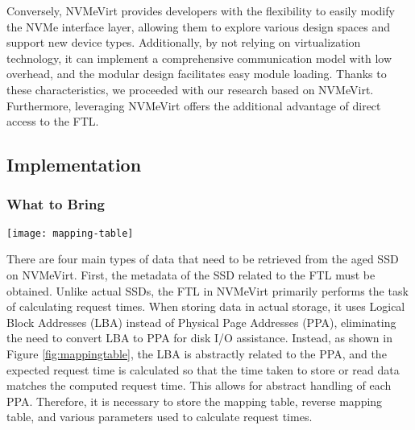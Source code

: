 

Conversely, NVMeVirt provides developers with the flexibility to easily modify the NVMe interface layer, allowing them to explore various design spaces and support new device types.
Additionally, by not relying on virtualization technology, it can implement a comprehensive communication model with low overhead, and the modular design facilitates easy module loading.
Thanks to these characteristics, we proceeded with our research based on NVMeVirt.
Furthermore, leveraging NVMeVirt offers the additional advantage of direct access to the FTL.

\subsection{Implementation}

\subsubsection{What to Bring}

\begin{figure*}[t]
    \centering
    \texttt{[image: mapping-table]}
    \caption{NVMeVirt’s relation between FTL and data save process}
    \label{fig:mappingtable}
\end{figure*}

There are four main types of data that need to be retrieved from the aged SSD on NVMeVirt.
First, the metadata of the SSD related to the FTL must be obtained.
Unlike actual SSDs, the FTL in NVMeVirt primarily performs the task of calculating request times.
When storing data in actual storage, it uses Logical Block Addresses (LBA) instead of Physical Page Addresses (PPA), eliminating the need to convert LBA to PPA for disk I/O assistance.
Instead, as shown in Figure \ref{fig:mappingtable}, the LBA is abstractly related to the PPA, and the expected request time is calculated so that the time taken to store or read data matches the computed request time.
This allows for abstract handling of each PPA.
Therefore, it is necessary to store the mapping table, reverse mapping table, and various parameters used to calculate request times.


